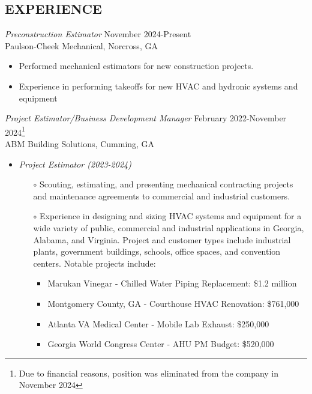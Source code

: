 \documentclass[margin]{res}
\begin{document}
\begin{resume}
\section{EXPERIENCE}
    {\sl Preconstruction Estimator} \hfill November 2024-Present \\
    Paulson-Cheek Mechanical, Norcross, GA
    \begin{itemize} \itemsep -2pt
      \item Performed mechanical estimators for new construction projects.
      \item Experience in performing takeoffs for new HVAC and hydronic systems and equipment
     \end{itemize}
    {\sl Project Estimator/Business Development Manager} \hfill February 2022-November 2024\footnote{Due to financial reasons, position was eliminated from the company in November 2024} \\
    ABM Building Solutions, Cumming, GA
    \begin{itemize}  \itemsep -2pt %
    \item {\sl Project Estimator (2023-2024)}
      \begin{itemize}
            \item[$\circ$] Scouting, estimating, and presenting mechanical contracting projects and maintenance agreements to commercial and industrial customers.
            \item[$\circ$] Experience in designing and sizing HVAC systems and equipment for a wide variety of public, commercial and industrial applications in Georgia, Alabama, and Virginia. Project and customer types include industrial plants, government buildings, schools, office spaces, and convention centers. Notable projects include:
              \begin{itemize}
              \item Marukan Vinegar - Chilled Water Piping Replacement: \$1.2 million
              \item Montgomery County, GA - Courthouse HVAC Renovation: \$761,000
              \item Atlanta VA Medical Center - Mobile Lab Exhaust: \$250,000
              \item Georgia World Congress Center - AHU PM Budget: \$520,000
              \end{itemize}

\end{itemize}
\end{itemize}
\end{resume}
\end{document}
